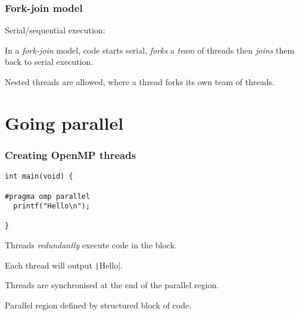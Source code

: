 \documentclass{beamer}
\begin{document}
\begin{frame}
\frametitle{Fork-join model}
Serial/sequential execution:
\begin{center}
\end{center}

\pause

In a \emph{fork-join} model, code starts serial, \emph{forks} a \emph{team} of threads then \emph{joins} them back to serial execution.
\begin{center}
\end{center}

Nested threads are allowed, where a thread forks its own team of threads.
\end{frame}

\section{Going parallel}
\begin{frame}[fragile]
\frametitle{Creating OpenMP threads}
\begin{verbatim}
int main(void) {

#pragma omp parallel
  printf("Hello\n");

}
\end{verbatim}

Threads \emph{redundantly} execute code in the block.

Each thread will output \texttt|Hello|.

Threads are synchronised at the end of the parallel region.

Parallel region defined by structured block of code.

\end{frame}
\end{document}

